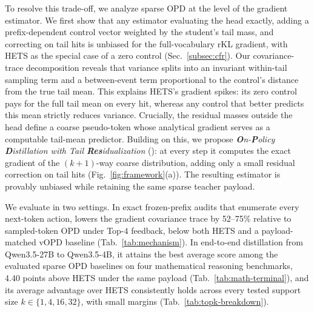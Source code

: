 To resolve this trade-off, we analyze sparse OPD at the level of the gradient estimator. We first show that any estimator evaluating the head exactly, adding a prefix-dependent control vector weighted by the student's tail mass, and correcting on tail hits is unbiased for the full-vocabulary rKL gradient, with HETS as the special case of a zero control (Sec.~\ref{subsec:cfr}). Our covariance-trace decomposition reveals that variance splits into an invariant within-tail sampling term and a between-event term proportional to the control's distance from the true tail mean. This explains HETS's gradient spikes: its zero control pays for the full tail mean on every hit, whereas any control that better predicts this mean strictly reduces variance. Crucially, the residual masses outside the head define a coarse pseudo-token \citep{anshumann-etal-2025-sparse,huang2026tail} whose analytical gradient serves as a computable tail-mean predictor. Building on this, we propose \textit{\textbf{O}n-\textbf{P}olicy \textbf{D}istillation with Tail \textbf{Res}idualization} (\method{}): at every step it computes the exact gradient of the $(k+1)$-way coarse distribution, adding only a small residual correction on tail hits (Fig.~\ref{fig:framework}(a)). The resulting estimator is provably unbiased while retaining the same sparse teacher payload.

We evaluate \method{} in two settings. In exact frozen-prefix audits that enumerate every next-token action, \method{} lowers the gradient covariance trace by 52--75\% relative to sampled-token OPD under Top-$4$ feedback, below both HETS and a payload-matched vOPD baseline (Tab.~\ref{tab:mechanism}). In end-to-end distillation from Qwen3.5-27B to Qwen3.5-4B, it attains the best average score among the evaluated sparse OPD baselines on four mathematical reasoning benchmarks, 4.40 points above HETS under the same payload (Tab.~\ref{tab:math-terminal}),
and its average advantage over HETS consistently holds across every tested support size $k\in\{1,4,16,32\}$, with small margins (Tab.~\ref{tab:topk-breakdown}).

